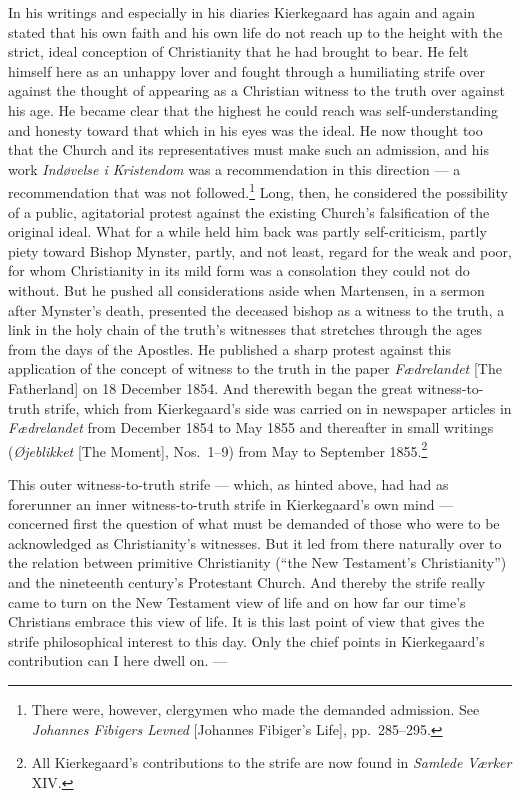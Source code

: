 \documentclass[12pt,a4paper]{book}
\newcommand{\opage}[1]{\marginnote{\footnotesize\textit{[#1]}}}
\begin{document}
In his writings and especially in his diaries Kierkegaard has again and again stated that his own
faith and his own life do not reach up to the height with the strict, ideal conception of
Christianity that he had brought to bear. He felt himself here as an unhappy lover and fought
through a humiliating strife over against the thought of appearing as a Christian witness to the
truth over against his age. He became clear that the highest he could reach was self-understanding
and honesty toward that which in his eyes was the ideal. He now thought too that the Church and
its representatives must make such an admission, and his work \emph{Indøvelse i Kristendom} was a
recommendation in this direction --- a recommendation that was not followed.\footnote{There were,
however, clergymen who made the demanded admission. See \emph{Johannes Fibigers Levned} [Johannes
Fibiger's Life], pp.~285--295.} Long, then, he considered the possibility of a public, agitatorial
protest against the existing Church's falsification of the original ideal. What for a while held
him back was partly self-criticism, partly piety toward Bishop Mynster, partly, and not least,
regard for the weak and poor, for whom \opage{168}Christianity in its mild form was a consolation they could
not do without. But he pushed all considerations aside when Martensen, in a sermon after Mynster's
death, presented the deceased bishop as a witness to the truth, a link in the holy chain of the
truth's witnesses that stretches through the ages from the days of the Apostles. He published a
sharp protest against this application of the concept of witness to the truth in the paper
\emph{Fædrelandet} [The Fatherland] on 18 December 1854. And therewith began the great
witness-to-truth strife, which from Kierkegaard's side was carried on in newspaper articles in
\emph{Fædrelandet} from December 1854 to May 1855 and thereafter in small writings (\emph{Øjeblikket}
[The Moment], Nos.~1--9) from May to September 1855.\footnote{All Kierkegaard's contributions to the
strife are now found in \emph{Samlede Værker} XIV.}

This outer witness-to-truth strife --- which, as hinted above, had had as forerunner an inner
witness-to-truth strife in Kierkegaard's own mind --- concerned first the question of what must be
demanded of those who were to be acknowledged as Christianity's witnesses. But it led from there
naturally over to the relation between primitive Christianity (``the New Testament's Christianity'')
and the nineteenth century's Protestant Church. And thereby the strife really came to turn on the
New Testament view of life and on how far our time's Christians embrace this view of life. It is
this last point of view that gives the strife philosophical interest to this day. Only the chief
points in Kierkegaard's contribution can I here dwell on. ---
\end{document}
